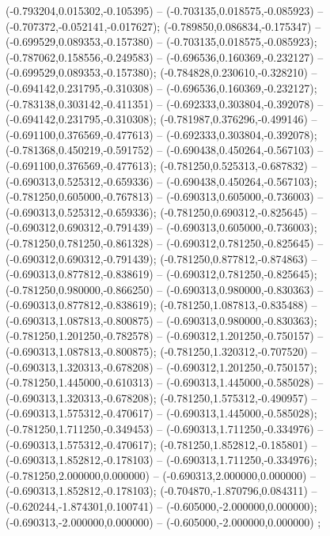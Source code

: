  (-0.793204,0.015302,-0.105395) -- (-0.703135,0.018575,-0.085923) -- (-0.707372,-0.052141,-0.017627);
 (-0.789850,0.086834,-0.175347) -- (-0.699529,0.089353,-0.157380) -- (-0.703135,0.018575,-0.085923);
 (-0.787062,0.158556,-0.249583) -- (-0.696536,0.160369,-0.232127) -- (-0.699529,0.089353,-0.157380);
 (-0.784828,0.230610,-0.328210) -- (-0.694142,0.231795,-0.310308) -- (-0.696536,0.160369,-0.232127);
 (-0.783138,0.303142,-0.411351) -- (-0.692333,0.303804,-0.392078) -- (-0.694142,0.231795,-0.310308);
 (-0.781987,0.376296,-0.499146) -- (-0.691100,0.376569,-0.477613) -- (-0.692333,0.303804,-0.392078);
 (-0.781368,0.450219,-0.591752) -- (-0.690438,0.450264,-0.567103) -- (-0.691100,0.376569,-0.477613);
 (-0.781250,0.525313,-0.687832) -- (-0.690313,0.525312,-0.659336) -- (-0.690438,0.450264,-0.567103);
 (-0.781250,0.605000,-0.767813) -- (-0.690313,0.605000,-0.736003) -- (-0.690313,0.525312,-0.659336);
 (-0.781250,0.690312,-0.825645) -- (-0.690312,0.690312,-0.791439) -- (-0.690313,0.605000,-0.736003);
 (-0.781250,0.781250,-0.861328) -- (-0.690312,0.781250,-0.825645) -- (-0.690312,0.690312,-0.791439);
 (-0.781250,0.877812,-0.874863) -- (-0.690313,0.877812,-0.838619) -- (-0.690312,0.781250,-0.825645);
 (-0.781250,0.980000,-0.866250) -- (-0.690313,0.980000,-0.830363) -- (-0.690313,0.877812,-0.838619);
 (-0.781250,1.087813,-0.835488) -- (-0.690313,1.087813,-0.800875) -- (-0.690313,0.980000,-0.830363);
 (-0.781250,1.201250,-0.782578) -- (-0.690312,1.201250,-0.750157) -- (-0.690313,1.087813,-0.800875);
 (-0.781250,1.320312,-0.707520) -- (-0.690313,1.320313,-0.678208) -- (-0.690312,1.201250,-0.750157);
 (-0.781250,1.445000,-0.610313) -- (-0.690313,1.445000,-0.585028) -- (-0.690313,1.320313,-0.678208);
 (-0.781250,1.575312,-0.490957) -- (-0.690313,1.575312,-0.470617) -- (-0.690313,1.445000,-0.585028);
 (-0.781250,1.711250,-0.349453) -- (-0.690313,1.711250,-0.334976) -- (-0.690313,1.575312,-0.470617);
 (-0.781250,1.852812,-0.185801) -- (-0.690313,1.852812,-0.178103) -- (-0.690313,1.711250,-0.334976);
 (-0.781250,2.000000,0.000000) -- (-0.690313,2.000000,0.000000) -- (-0.690313,1.852812,-0.178103);
 (-0.704870,-1.870796,0.084311) -- (-0.620244,-1.874301,0.100741) -- (-0.605000,-2.000000,0.000000);
 (-0.690313,-2.000000,0.000000) -- (-0.605000,-2.000000,0.000000) ;
